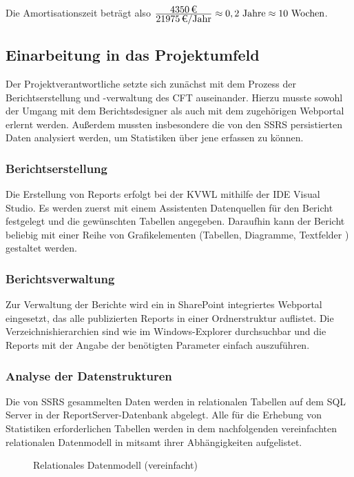 Die Amortisationszeit beträgt also $\frac{\eur{4350}}{\eur{21975}\mbox{/Jahr}} \approx 0,2 \mbox{ Jahre} \approx 10 \mbox{ Wochen}$.

\subsection{Einarbeitung in das Projektumfeld}
\label{sec:Einarbeitung}
Der Projektverantwortliche \autorName\xspace setzte sich zunächst mit dem Prozess der Berichtserstellung und -verwaltung des \ac{CFT} \teamName auseinander. Hierzu musste sowohl der Umgang mit dem Berichtsdesigner als auch mit dem zugehörigen Webportal erlernt werden. Außerdem mussten insbesondere die von den \ac{SSRS} persistierten Daten analysiert werden, um Statistiken über jene erfassen zu können.

\subsubsection{Berichtserstellung}
\label{sec:Berichtserstellung}
Die Erstellung von Reports erfolgt bei der \ac{KVWL} mithilfe der \ac{IDE} Visual Studio. Es werden zuerst mit einem Assistenten Datenquellen für den Bericht festgelegt und die gewünschten Tabellen angegeben. Daraufhin kann der Bericht beliebig mit einer Reihe von Grafikelementen (Tabellen, Diagramme, Textfelder \etc) gestaltet werden.

\subsubsection{Berichtsverwaltung}
\label{sec:Berichtsverwaltung}
Zur Verwaltung der Berichte wird ein in SharePoint integriertes Webportal eingesetzt, das alle publizierten Reports in einer Ordnerstruktur auflistet. Die Verzeichnishierarchien sind wie im Windows-Explorer durchsuchbar und die Reports mit der Angabe der benötigten Parameter einfach auszuführen.

\subsubsection{Analyse der Datenstrukturen}
\label{sec:Datenstrukturen}
Die von \ac{SSRS} gesammelten Daten werden in relationalen Tabellen auf dem SQL Server in der ReportServer-Datenbank abgelegt. Alle für die Erhebung von Statistiken erforderlichen Tabellen werden in dem nachfolgenden vereinfachten relationalen Datenmodell in  mitsamt ihrer Abhängigkeiten aufgelistet.
\begin{figure}[htb]
	\centering
	\caption{Relationales Datenmodell (vereinfacht)}
	\label{fig:Datenmodell}
\end{figure}

